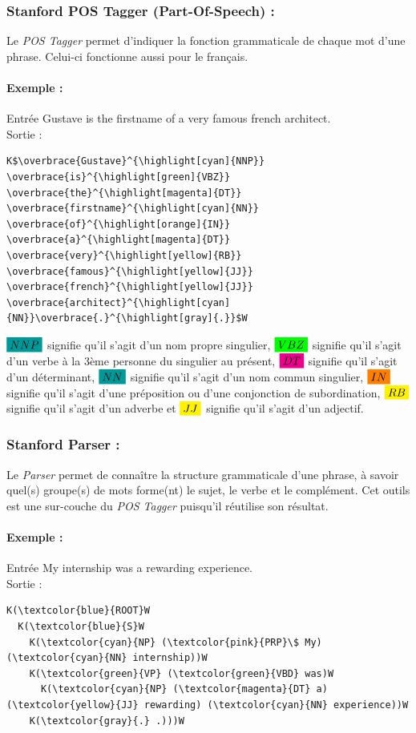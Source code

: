             \subsubsection{Stanford POS Tagger (Part-Of-Speech) :}
                Le \textit{POS Tagger} permet d'indiquer la fonction grammaticale de chaque mot d'une phrase. Celui-ci fonctionne aussi pour le français.

                \paragraph{Exemple :}
                    Entrée \og Gustave is the firstname of a very famous french architect.\fg\\
                    Sortie :
\begin{lstlisting}
K$\overbrace{Gustave}^{\highlight[cyan]{NNP}} \overbrace{is}^{\highlight[green]{VBZ}} \overbrace{the}^{\highlight[magenta]{DT}} \overbrace{firstname}^{\highlight[cyan]{NN}} \overbrace{of}^{\highlight[orange]{IN}} \overbrace{a}^{\highlight[magenta]{DT}} \overbrace{very}^{\highlight[yellow]{RB}} \overbrace{famous}^{\highlight[yellow]{JJ}} \overbrace{french}^{\highlight[yellow]{JJ}} \overbrace{architect}^{\highlight[cyan]{NN}}\overbrace{.}^{\highlight[gray]{.}}$W
\end{lstlisting}
                \textit{$\highlight[cyan]{NNP}$} signifie qu'il s'agit d'un nom propre singulier, \textit{$\highlight[green]{VBZ}$} signifie qu'il s'agit d'un verbe à la 3ème personne du singulier au présent, \textit{$\highlight[magenta]{DT}$} signifie qu'il s'agit d'un déterminant, \textit{$\highlight[cyan]{NN}$} signifie qu'il s'agit d'un nom commun singulier, \textit{$\highlight[orange]{IN}$} signifie qu'il s'agit d'une préposition ou d'une conjonction de subordination, \textit{$\highlight[yellow]{RB}$} signifie qu'il s'agit d'un adverbe et \textit{$\highlight[yellow]{JJ}$} signifie qu'il s'agit d'un adjectif.

            \subsubsection{Stanford Parser :}
                Le \textit{Parser} permet de connaître la structure grammaticale d'une phrase, à savoir quel(s) groupe(s) de mots forme(nt) le sujet, le verbe et le complément. Cet outils est une sur-couche du \textit{POS Tagger} puisqu'il réutilise son résultat.

                \paragraph{Exemple :}
                Entrée \og My internship was a rewarding experience.\fg\\
                Sortie :
\begin{lstlisting}
K(\textcolor{blue}{ROOT}W
  K(\textcolor{blue}{S}W
    K(\textcolor{cyan}{NP} (\textcolor{pink}{PRP}\$ My) (\textcolor{cyan}{NN} internship))W
    K(\textcolor{green}{VP} (\textcolor{green}{VBD} was)W
      K(\textcolor{cyan}{NP} (\textcolor{magenta}{DT} a) (\textcolor{yellow}{JJ} rewarding) (\textcolor{cyan}{NN} experience))W
    K(\textcolor{gray}{.} .)))W
\end{lstlisting}

